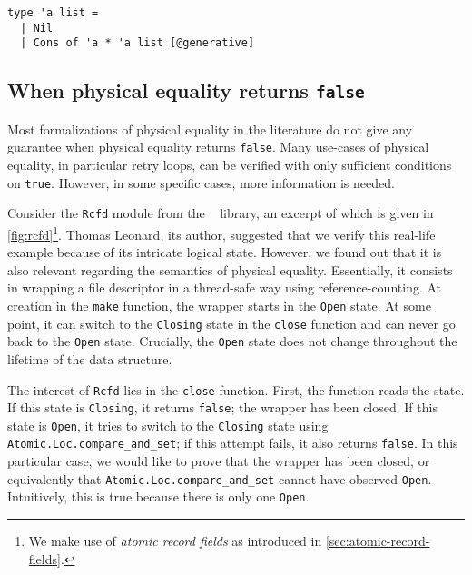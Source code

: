 \begin{verbatim}
type 'a list =
  | Nil
  | Cons of 'a * 'a list [@generative]
\end{verbatim}

\subsection{When physical equality returns \texttt{false}}



Most formalizations of physical equality in the literature do not give any guarantee when physical equality returns \texttt{false}.
Many use-cases of physical equality, in particular retry loops, can be verified with only sufficient conditions on \texttt{true}.
However, in some specific cases, more information is needed.

Consider the \texttt{Rcfd} module from the \Eio~\cite{eio} library, an excerpt of which is given in \cref{fig:rcfd}\footnote{We make use of \emph{atomic record fields} as introduced in \cref{sec:atomic-record-fields}.}.
Thomas Leonard, its author, suggested that we verify this real-life example because of its intricate logical state.
However, we found out that it is also relevant regarding the semantics of physical equality.
Essentially, it consists in wrapping a file descriptor in a thread-safe way using reference-counting.
At creation in the \texttt{make} function, the wrapper starts in the \texttt{Open} state.
At some point, it can switch to the \texttt{Closing} state in the \texttt{close} function and can never go back to the \texttt{Open} state.
Crucially, the \texttt{Open} state does not change throughout the lifetime of the data structure.

The interest of \texttt{Rcfd} lies in the \texttt{close} function.
First, the function reads the state.
If this state is \texttt{Closing}, it returns \texttt{false}; the wrapper has been closed.
If this state is \texttt{Open}, it tries to switch to the \texttt{Closing} state using \texttt{Atomic.Loc.compare_and_set}; if this attempt fails, it also returns \texttt{false}.
In this particular case, we would like to prove that the wrapper has been closed, or equivalently that \texttt{Atomic.Loc.compare_and_set} cannot have observed \texttt{Open}.
Intuitively, this is true because there is only one \texttt{Open}.

